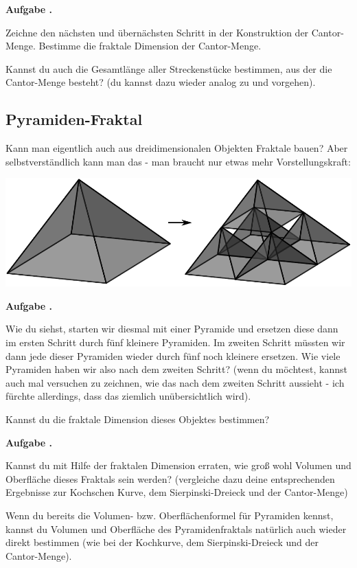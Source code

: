 \documentclass[a4paper,ngerman,12pt]{scrartcl}
\theoremstyle{definition}
\theoremstyle{plain}
\theoremstyle{remark}
\newlength{\aufgabenskip}
\newcounter{aufgabennummer}
\newenvironment{aufgabe}[1]{
  \addtocounter{aufgabennummer}{1}
  \textbf{Aufgabe \theaufgabennummer.} \emph{#1} \par
}{\vspace{\aufgabenskip}}
\begin{document}
\newpage

\begin{aufgabe}{}
	Zeichne den nächsten und übernächsten Schritt in der Konstruktion der Cantor-Menge. Bestimme die fraktale Dimension der Cantor-Menge. 
	
	Kannst du auch die Gesamtlänge aller \glqq Streckenstücke\grqq{} bestimmen, aus der die Cantor-Menge besteht? (du kannst dazu wieder analog zu  und  vorgehen).
\end{aufgabe}


\subsection{Pyramiden-Fraktal}

Kann man eigentlich auch aus dreidimensionalen Objekten Fraktale bauen? Aber selbstverständlich kann man das - man braucht nur etwas mehr Vorstellungskraft:

\begin{center}
	\includegraphics[width=.6\textwidth]{Bilder/Pyramiden.pdf}
\end{center}

\begin{aufgabe}{}
	Wie du siehst, starten wir diesmal mit einer Pyramide und ersetzen diese dann im ersten Schritt durch fünf kleinere Pyramiden. Im zweiten Schritt müssten wir dann jede dieser Pyramiden wieder durch fünf noch kleinere ersetzen. Wie viele Pyramiden haben wir also nach dem zweiten Schritt? (wenn du möchtest, kannst auch mal versuchen zu zeichnen, wie das nach dem zweiten Schritt aussieht - ich fürchte allerdings, dass das ziemlich unübersichtlich wird).
	
	Kannst du die fraktale Dimension dieses Objektes bestimmen? 
\end{aufgabe}
	
\begin{aufgabe}{}
	Kannst du mit Hilfe der fraktalen Dimension erraten,  wie groß wohl Volumen und Oberfläche dieses Fraktals sein werden? (vergleiche dazu deine entsprechenden Ergebnisse zur Kochschen Kurve, dem Sierpinski-Dreieck und der Cantor-Menge) 
	
	Wenn du bereits die Volumen- bzw. Oberflächenformel für Pyramiden kennst, kannst du Volumen und Oberfläche des Pyramidenfraktals natürlich auch wieder direkt bestimmen (wie bei der Kochkurve, dem Sierpinski-Dreieck und der Cantor-Menge).
\end{aufgabe}
 
\end{document}
